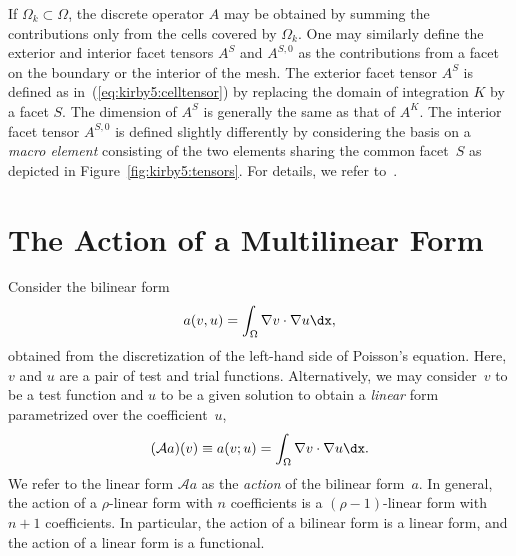 If $\Omega_k \subset \Omega$, the discrete operator $A$ may be
obtained by summing the contributions only from the cells covered by
$\Omega_k$. One may similarly define the exterior and interior facet
tensors $A^S$ and $A^{S,0}$ as the contributions from a facet on the
boundary or the interior of the mesh. The exterior facet tensor $A^S$
is defined as in~(\ref{eq:kirby5:celltensor}) by replacing the domain
of integration $K$ by a facet $S$. The dimension of $A^S$ is generally
the same as that of $A^K$. The interior facet tensor $A^{S,0}$ is
defined slightly differently by considering the basis on a \emph{macro
  element} consisting of the two elements sharing the common facet~$S$
as depicted in Figure~\ref{fig:kirby5:tensors}. For details, we refer
to~\cite{OlgaardLoggWells2008}.

\section{The Action of a Multilinear Form}

Consider the bilinear form
\begin{displaymath}
  a(v, u) = \int_{\Omega} \nabla v \cdot \nabla u \dx,
\end{displaymath}
obtained from the discretization of the left-hand side of Poisson's
equation. Here, $v$ and $u$ are a pair of test and trial functions.
Alternatively, we may consider~$v$ to be a test function and $u$ to be
a given solution to obtain a \emph{linear} form parametrized over the
coefficient~$u$,
\begin{displaymath}
  (\mathcal{A} a) (v) \equiv a(v; u) = \int_{\Omega} \nabla v \cdot \nabla u \dx.
\end{displaymath}
We refer to the linear form $\mathcal{A}a$ as the \emph{action} of the
bilinear form~$a$. In general, the action of a $\rho$-linear form with
$n$ coefficients is a $(\rho-1)$-linear form with $n+1$ coefficients.
In particular, the action of a bilinear form is a linear form, and the
action of a linear form is a functional.

